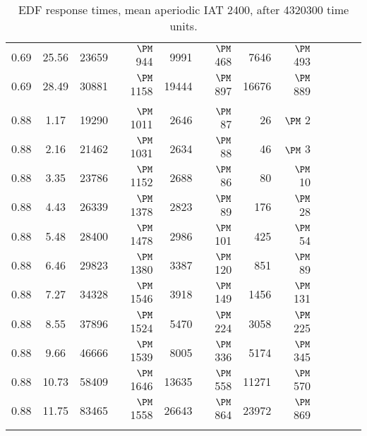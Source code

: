 \begin{table}
\begin{center}
\begin{tabular}{ccr@{}rr@{}rr@{}rr@{}rr@{}r}
0.69 & 25.56 & 23659 & $\PM$ 944 &  9991 & $\PM$ 468 &  7646 & $\PM$ 493\\
0.69 & 28.49 & 30881 & $\PM$ 1158 & 19444 & $\PM$ 897 & 16676 & $\PM$ 889\\
\\
0.88 & 1.17 & 19290 & $\PM$ 1011 &  2646 & $\PM$  87 &    26 & $\PM$   2\\
0.88 & 2.16 & 21462 & $\PM$ 1031 &  2634 & $\PM$  88 &    46 & $\PM$   3\\
0.88 & 3.35 & 23786 & $\PM$ 1152 &  2688 & $\PM$  86 &    80 & $\PM$  10\\
0.88 & 4.43 & 26339 & $\PM$ 1378 &  2823 & $\PM$  89 &   176 & $\PM$  28\\
0.88 & 5.48 & 28400 & $\PM$ 1478 &  2986 & $\PM$ 101 &   425 & $\PM$  54\\
0.88 & 6.46 & 29823 & $\PM$ 1380 &  3387 & $\PM$ 120 &   851 & $\PM$  89\\
0.88 & 7.27 & 34328 & $\PM$ 1546 &  3918 & $\PM$ 149 &  1456 & $\PM$ 131\\
0.88 & 8.55 & 37896 & $\PM$ 1524 &  5470 & $\PM$ 224 &  3058 & $\PM$ 225\\
0.88 & 9.66 & 46666 & $\PM$ 1539 &  8005 & $\PM$ 336 &  5174 & $\PM$ 345\\
0.88 & 10.73 & 58409 & $\PM$ 1646 & 13635 & $\PM$ 558 & 11271 & $\PM$ 570\\
0.88 & 11.75 & 83465 & $\PM$ 1558 & 26643 & $\PM$ 864 & 23972 & $\PM$ 869\\
\\
\end{tabular}\end{center}\caption{EDF response times, mean aperiodic IAT 2400, after 4320300 time units.}
\label{tab:A}\end{table}
